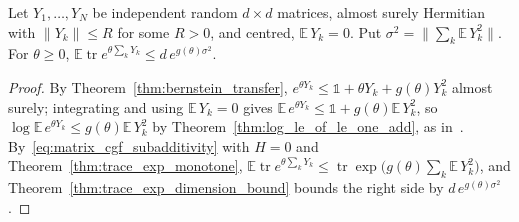 \begin{theorem}
    \label{thm:bernstein_trace_mgf}
    \leanok
    Let $Y_1,\dots,Y_N$ be independent random $d\times d$ matrices, almost surely
    Hermitian with $\|Y_k\|\le R$ for some $R>0$, and centred, $\mathbb{E}\,Y_k=0$.
    Put $\sigma^{2}=\bigl\|\sum_k\mathbb{E}\,Y_k^{2}\bigr\|$. For $\theta\ge0$,
    $\mathbb{E}\operatorname{tr}e^{\theta\sum_kY_k}\le d\,e^{g(\theta)\sigma^{2}}$.
\end{theorem}
\begin{proof}\leanok
    By Theorem~\ref{thm:bernstein_transfer},
    $e^{\theta Y_k}\le\mathbb{1}+\theta Y_k+g(\theta)Y_k^{2}$ almost surely;
    integrating and using $\mathbb{E}\,Y_k=0$ gives
    $\mathbb{E}\,e^{\theta Y_k}\le\mathbb{1}+g(\theta)\mathbb{E}\,Y_k^{2}$, so
    $\log\mathbb{E}\,e^{\theta Y_k}\le g(\theta)\mathbb{E}\,Y_k^{2}$ by
    Theorem~\ref{thm:log_le_of_le_one_add}, as in~\cite[Lemma~6.7]{Tropp2012User}.
    By~\eqref{eq:matrix_cgf_subadditivity} with $H=0$ and
    Theorem~\ref{thm:trace_exp_monotone},
    $\mathbb{E}\operatorname{tr}e^{\theta\sum_kY_k}
        \le\operatorname{tr}\exp\bigl(g(\theta)\sum_k\mathbb{E}\,Y_k^{2}\bigr)$,
    and Theorem~\ref{thm:trace_exp_dimension_bound} bounds the right side by
    $d\,e^{g(\theta)\sigma^{2}}$.
\end{proof}

